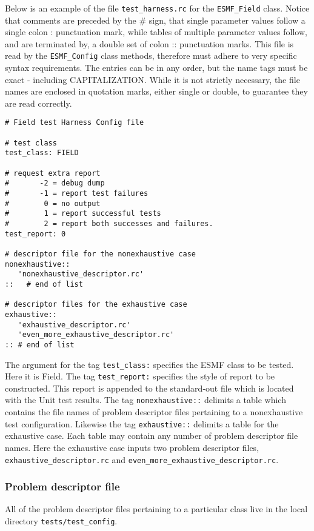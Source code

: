 Below is an example of the file \texttt{test\_harness.rc} for the \texttt{ESMF\_Field} class. Notice that comments are preceded by the {\#} sign, that single parameter values follow a single colon {:} punctuation mark, while tables of multiple parameter values follow, and are terminated by, a double set of colon {::} punctuation marks.  This file is read by the \texttt{ESMF\_Config} class methods, therefore must adhere to very specific syntax requirements. The entries can be in any order, but the name tags must be exact - including CAPITALIZATION. While it is not strictly necessary, the file names are enclosed in quotation marks, either single or double, to guarantee they are read correctly.
\begin{verbatim}
# Field test Harness Config file

# test class
test_class: FIELD 

# request extra report
#       -2 = debug dump
#       -1 = report test failures 
#        0 = no output
#        1 = report successful tests
#        2 = report both successes and failures.
test_report: 0 

# descriptor file for the nonexhaustive case
nonexhaustive::
   'nonexhaustive_descriptor.rc'
::   # end of list

# descriptor files for the exhaustive case
exhaustive::
   'exhaustive_descriptor.rc'
   'even_more_exhaustive_descriptor.rc'
:: # end of list
\end{verbatim}

The argument for the tag \texttt{test\_class:} specifies the ESMF class to be tested. Here it is Field. The tag  \texttt{test\_report:} specifies the style of report to be constructed. This report is appended to the standard-out file which is located with the Unit test results. The tag \texttt{nonexhaustive::} delimits a table which contains the file names of problem descriptor files pertaining to a nonexhaustive test configuration. Likewise the tag \texttt{exhaustive::} delimits a table for the exhaustive case. Each table may contain any number of problem descriptor file names. Here the exhaustive case inputs two problem descriptor files, \texttt{exhaustive\_descriptor.rc} and \texttt{even\_more\_exhaustive\_descriptor.rc}.

\subsubsection{Problem descriptor file}
\label{sec:harness_problemdescriptorfile}
All of the problem descriptor files pertaining to a particular class live in the local directory \texttt{tests/test\_config}.

